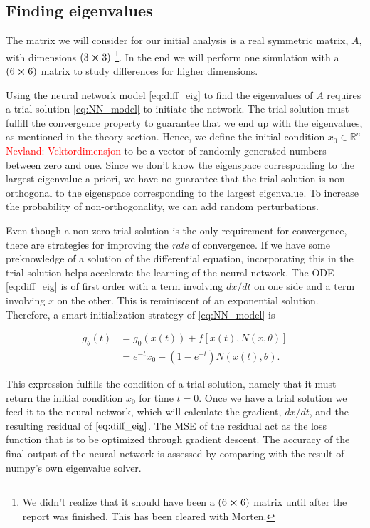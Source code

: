\documentclass[12pt]{extarticle}
\begin{document}
\subsection{Finding eigenvalues}
The matrix we will consider for our initial analysis is a real symmetric matrix, $A$, with dimensions $(3\cross3)$ \footnote{We didn't realize that it should have been a $(6\cross6)$ matrix until after the report was finished. This has been cleared with Morten.}. In the end we will perform one simulation with a $(6\cross6)$ matrix to study differences for higher dimensions. 

Using the neural network model \eqref{eq:diff_eig} to find the eigenvalues of $A$ requires a trial solution \eqref{eq:NN_model} to initiate the network. The trial solution must fulfill the convergence property to guarantee that we end up with the eigenvalues, as mentioned in the theory section. Hence, we define the initial condition $x_0 \in \mathbb{R}^n$ \textcolor{red}{Nevland: Vektordimensjon} to be a vector of randomly generated numbers between zero and one. Since we don't know the eigenspace corresponding to the largest eigenvalue a priori, we have no guarantee that the trial solution is non-orthogonal to the eigenspace corresponding to the largest eigenvalue. To increase the probability of non-orthogonality, we can add random perturbations.

Even though a non-zero trial solution is the only requirement for convergence, there are strategies for improving the \textit{rate} of convergence. If we have some preknowledge of a solution of the differential equation, incorporating this in the trial solution helps accelerate the learning of the neural network. The ODE \eqref{eq:diff_eig} is of first order with a term involving $dx/dt$ on one side and a term involving $x$ on the other. This is reminiscent of an exponential solution. Therefore, a smart initialization strategy of \eqref{eq:NN_model} is 

\begin{align}
	g_{\theta}(t) &= g_0(x(t)) + f[x(t),N(x, \theta)] \nonumber \\
	&= e^{-t}x_0 + (1 - e^{-t})N(x(t), \theta).
\end{align}

This expression fulfills the condition of a trial solution, namely that it must return the initial condition $x_0$ for time $t=0$. Once we have a trial solution we feed it to the neural network, which will calculate the gradient, $dx/dt$, and the resulting residual of $\eqref{eq:diff_eig}$. The MSE of the residual act as the loss function that is to be optimized through gradient descent. The accuracy of the final output of the neural network is assessed by comparing with the result of numpy's own eigenvalue solver. 
\end{document}
